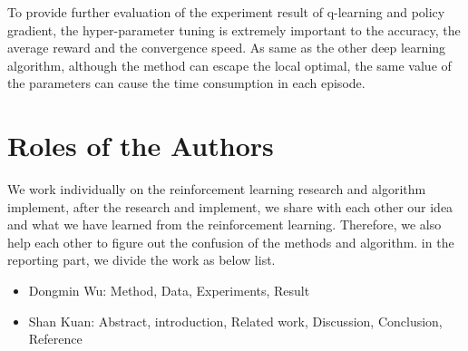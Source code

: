 \documentclass[article]{aaltoseries}
\begin{document}
To provide further evaluation of the experiment result of q-learning and policy gradient, the hyper-parameter tuning is extremely important to the accuracy, the average reward and the convergence speed. As same as the other deep learning algorithm, although the method can escape the local optimal, the same value of the parameters can cause the time consumption in each episode.










\section{Roles of the Authors}
We work individually on the reinforcement learning research and algorithm implement, after the research and implement, we share with each other our idea and what we have learned from the reinforcement learning. Therefore, we also help each other to figure out the confusion of the methods and algorithm. in the reporting part, we divide the work as below list.
\begin{itemize}
\item Dongmin Wu: Method, Data, Experiments, Result
\item Shan Kuan: Abstract, introduction, Related work, Discussion, Conclusion, Reference
\end{itemize}
\end{document}
